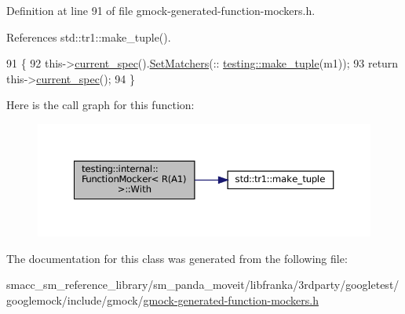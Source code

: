 Definition at line 91 of file gmock-\/generated-\/function-\/mockers.\+h.



References std\+::tr1\+::make\+\_\+tuple().


\begin{DoxyCode}
91                                            \{
92     this->\hyperlink{classtesting_1_1internal_1_1FunctionMockerBase_a744318106e20b346f4f1efbf5a601644}{current\_spec}().\hyperlink{classtesting_1_1internal_1_1MockSpec_a6b4fd303136c6282b19ddb16100f02a2}{SetMatchers}(::
      \hyperlink{namespacestd_1_1tr1_af7e12a0f5b5791b5b7c49a5a17b85359}{testing::make\_tuple}(m1));
93     \textcolor{keywordflow}{return} this->\hyperlink{classtesting_1_1internal_1_1FunctionMockerBase_a744318106e20b346f4f1efbf5a601644}{current\_spec}();
94   \}
\end{DoxyCode}
Here is the call graph for this function\+:
\nopagebreak
\begin{figure}[H]
\begin{center}
\leavevmode
\includegraphics[width=350pt]{classtesting_1_1internal_1_1FunctionMocker_3_01R_07A1_08_4_aa61b5c24c52b8c49713774c49a01b26e_cgraph}
\end{center}
\end{figure}


The documentation for this class was generated from the following file\+:\begin{DoxyCompactItemize}
\item 
smacc\+\_\+sm\+\_\+reference\+\_\+library/sm\+\_\+panda\+\_\+moveit/libfranka/3rdparty/googletest/googlemock/include/gmock/\hyperlink{gmock-generated-function-mockers_8h}{gmock-\/generated-\/function-\/mockers.\+h}\end{DoxyCompactItemize}
